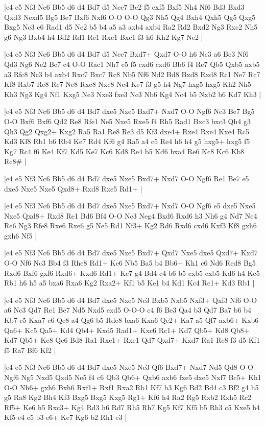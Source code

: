 \whitename{}
\blackname{}
\makegametitle
|e4 e5 Nf3 Nc6 Bb5 d6 d4 Bd7 d5 Nce7 Be2 f5 exf5 Bxf5 Nh4 Nf6 Bd3 Bxd3 Qxd3 Nexd5 Bg5 Be7 Bxf6 Nxf6 O-O O-O Qg3 Nh5 Qg4 Bxh4 Qxh5 Qg5 Qxg5 Bxg5 Nc3 c6 Rad1 d5 Ne2 b5 b4 a5 a3 axb4 axb4 Ra2 Rd2 Bxd2 Ng3 Rxc2 Nh5 g6 Ng3 Bxb4 h4 Bd2 Rd1 Rc1 Rxc1 Bxc1 f3 h6 Kh2 Kg7 Ne2  |

\whitename{}
\blackname{}
\makegametitle
|e4 e5 Nf3 Nc6 Bb5 d6 d4 Bd7 d5 Nce7 Bxd7+ Qxd7 O-O h6 Nc3 a6 Be3 Nf6 Qd3 Ng6 Ne2 Be7 c4 O-O Rac1 Nh7 c5 f5 cxd6 cxd6 Bb6 f4 Rc7 Qb5 Qxb5 axb5 a3 Rfc8 Nc3 b4 axb4 Rxc7 Bxc7 Rc8 Nb5 Nf6 Nd2 Bd8 Bxd8 Rxd8 Rc1 Ne7 Rc7 Kf8 Rxb7 Rc8 Rc7 Ne8 Rxc8 Nxc8 Nc4 Ke7 f3 g5 h4 Ng7 hxg5 hxg5 Kh2 Nh5 Kh3 Ng3 Kg4 Nf1 Kxg5 Ne3 Nxe3 fxe3 Nc3 Nb6 Kg4 Nc4 b5 Nxb2 b6 Kd7 Kh3  |

\whitename{}
\blackname{}
\makegametitle
|e4 e5 Nf3 Nc6 Bb5 d6 d4 Bd7 dxe5 Nxe5 Bxd7+ Nxd7 O-O Ngf6 Nc3 Be7 Bg5 O-O Bxf6 Bxf6 Qd2 Re8 Rfe1 Ne5 Nxe5 Rxe5 f4 Rh5 Rad1 Bxc3 bxc3 Qh4 g3 Qh3 Qg2 Qxg2+ Kxg2 Ra5 Ra1 Re8 Re3 d5 Kf3 dxe4+ Rxe4 Rxe4 Kxe4 Rc5 Kd3 Kf8 Rb1 b6 Rb4 Ke7 Rd4 Kf6 g4 Ra5 a4 c5 Re4 h6 h4 g5 hxg5+ hxg5 f5 Kg7 Rc4 f6 Ke4 Kf7 Kd5 Ke7 Kc6 Kd8 Re4 b5 Kd6 bxa4 Re6 Kc8 Kc6 Kb8 Re8\#  |

\whitename{}
\blackname{}
\makegametitle
|e4 e5 Nf3 Nc6 Bb5 d6 d4 Bd7 dxe5 Nxe5 Bxd7+ Nxd7 O-O Ngf6 Re1 Be7 e5 dxe5 Nxe5 Nxe5 Qxd8+ Rxd8 Rxe5 Rd1+  |

\whitename{}
\blackname{}
\makegametitle
|e4 e5 Nf3 Nc6 Bb5 d6 d4 Bd7 dxe5 Nxe5 Bxd7+ Nxd7 O-O Ngf6 e5 dxe5 Nxe5 Nxe5 Qxd8+ Rxd8 Re1 Bd6 Bf4 O-O Nc3 Neg4 Bxd6 Rxd6 h3 Nh6 g4 Nd7 Ne4 Re6 Ng3 Rfe8 Rxe6 Rxe6 g5 Ne5 Rd1 Nf3+ Kg2 Rd6 Rxd6 cxd6 Kxf3 Kf8 gxh6 gxh6 Nf5  |

\whitename{}
\blackname{}
\makegametitle
|e4 e5 Nf3 Nc6 Bb5 d6 d4 Bd7 dxe5 Nxe5 Bxd7+ Qxd7 Nxe5 dxe5 Qxd7+ Kxd7 O-O Nf6 Nc3 Bb4 f3 Rhe8 Rd1+ Ke6 Nb5 Ba5 b4 Bb6+ Kh1 c6 Nd6 Red8 Bg5 Rxd6 Bxf6 gxf6 Rxd6+ Kxd6 Rd1+ Kc7 g4 Bd4 c4 b6 b5 cxb5 cxb5 Kd6 h4 Kc5 Rb1 h6 h5 a5 bxa6 Rxa6 Kg2 Rxa2+ Kf1 b5 Ke1 b4 Kd1 Kc4 Rc1+ Kd3 Rb1  |

\whitename{}
\blackname{}
\makegametitle
|e4 e5 Nf3 Nc6 Bb5 d6 d4 Bd7 dxe5 Nxe5 Nc3 Bxb5 Nxb5 Nxf3+ Qxf3 Nf6 O-O a6 Nc3 Qd7 Re1 Be7 Nd5 Nxd5 exd5 O-O-O c4 f6 Be3 Qa4 b3 Qd7 Ba7 b6 b4 Kb7 c5 Kxa7 c6 Qe8 a4 Qg6 b5 Rde8 bxa6 Kxa6 Qe2+ Ka7 a5 Qf7 axb6+ Kxb6 Qa6+ Kc5 Qa5+ Kd4 Qb4+ Kxd5 Rad1+ Kxc6 Rc1+ Kd7 Qb5+ Kd8 Qb8+ Kd7 Qb5+ Kc8 Qc6 Bd8 Ra1 Rxe1+ Rxe1 Qd7 Qxd7+ Kxd7 Ra1 Re8 f3 d5 Kf1 f5 Ra7 Bf6 Kf2  |

\whitename{}
\blackname{}
\makegametitle
|e4 e5 Nf3 Nc6 Bb5 d6 d4 Bd7 dxe5 Nxe5 Nc3 Qf6 Bxd7+ Nxd7 Nd5 Qd8 O-O Ngf6 Ng5 Nxd5 Qxd5 Ne5 f4 c6 Qb3 Qb6+ Qxb6 axb6 fxe5 dxe5 Nxf7 Bc5+ Kh1 O-O Nh6+ gxh6 Bxh6 Rxf1+ Rxf1 Rxa2 Rb1 Kf7 h3 Kg6 Bd2 Bd4 c3 Bf2 g4 h5 g5 Ra8 Kg2 Bh4 Kf3 Bxg5 Bxg5 Kxg5 Rg1+ Kf6 h4 Ra2 Rg5 Rxb2 Rxh5 Rc2 Rf5+ Ke6 h5 Rxc3+ Kg4 Rd3 h6 Rd7 Rh5 Rh7 Kg5 Kf7 Kf5 b5 Rh3 c5 Kxe5 b4 Kf5 c4 e5 b3 e6+ Ke7 Kg6 b2 Rh1 c3  |

